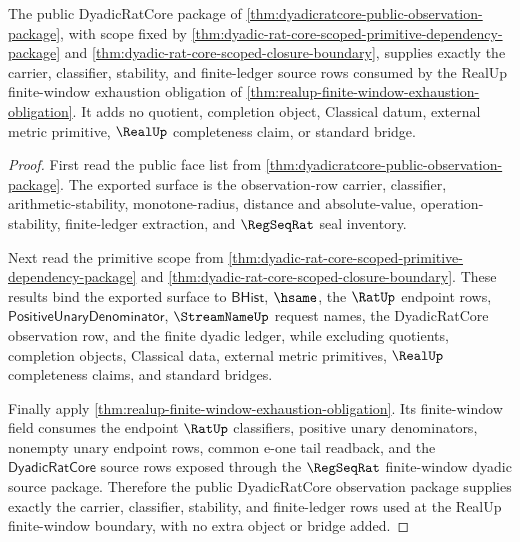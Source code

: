 \begin{theorem}
\label{thm:dyadicratcore-public-observation-realup-window-feed}
The public DyadicRatCore package of
\autoref{thm:dyadicratcore-public-observation-package}, with scope fixed by
\autoref{thm:dyadic-rat-core-scoped-primitive-dependency-package} and
\autoref{thm:dyadic-rat-core-scoped-closure-boundary}, supplies exactly the
carrier, classifier, stability, and finite-ledger source rows consumed by the
RealUp finite-window exhaustion obligation of
\autoref{thm:realup-finite-window-exhaustion-obligation}. It adds no quotient,
completion object, Classical datum, external metric primitive, $\RealUp$
completeness claim, or standard bridge.
\end{theorem}
\begin{proof}
First read the public face list from
\autoref{thm:dyadicratcore-public-observation-package}. The exported surface is
the observation-row carrier, classifier, arithmetic-stability,
monotone-radius, distance and absolute-value, operation-stability,
finite-ledger extraction, and $\RegSeqRat$ seal inventory.

Next read the primitive scope from
\autoref{thm:dyadic-rat-core-scoped-primitive-dependency-package} and
\autoref{thm:dyadic-rat-core-scoped-closure-boundary}. These results bind the
exported surface to $\mathsf{BHist}$, $\hsame$, the $\RatUp$ endpoint rows,
$\mathsf{PositiveUnaryDenominator}$, $\StreamNameUp$ request names, the
DyadicRatCore observation row, and the finite dyadic ledger, while excluding
quotients, completion objects, Classical data, external metric primitives,
$\RealUp$ completeness claims, and standard bridges.

Finally apply \autoref{thm:realup-finite-window-exhaustion-obligation}. Its
finite-window field consumes the endpoint $\RatUp$ classifiers, positive unary
denominators, nonempty unary endpoint rows, common e-one tail readback, and
the $\mathsf{DyadicRatCore}$ source rows exposed through the $\RegSeqRat$
finite-window dyadic source package. Therefore the public DyadicRatCore
observation package supplies exactly the carrier, classifier, stability, and
finite-ledger rows used at the RealUp finite-window boundary, with no extra
object or bridge added.
\end{proof}

